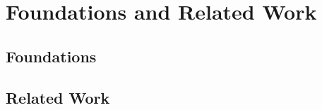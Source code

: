 
\chapter{Foundations and Related Work}
\label{chap:ch2}

\section{Foundations}

\section{Related Work}

